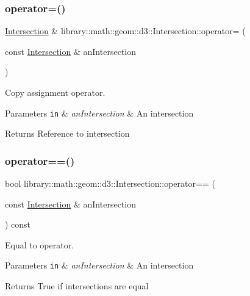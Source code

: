 \subsubsection{\texorpdfstring{operator=()}{operator=()}}
{\footnotesize\ttfamily \hyperlink{classlibrary_1_1math_1_1geom_1_1d3_1_1_intersection}{Intersection} \& library\+::math\+::geom\+::d3\+::\+Intersection\+::operator= (\begin{DoxyParamCaption}\item[{const \hyperlink{classlibrary_1_1math_1_1geom_1_1d3_1_1_intersection}{Intersection} \&}]{an\+Intersection }\end{DoxyParamCaption})}



Copy assignment operator. 


\begin{DoxyParams}[1]{Parameters}
\mbox{\tt in}  & {\em an\+Intersection} & An intersection \\
\hline
\end{DoxyParams}
\begin{DoxyReturn}{Returns}
Reference to intersection 
\end{DoxyReturn}
\mbox{\label{classlibrary_1_1math_1_1geom_1_1d3_1_1_intersection_a4205e2dcace3faa8abfeb829423d0baf}} 
\subsubsection{\texorpdfstring{operator==()}{operator==()}}
{\footnotesize\ttfamily bool library\+::math\+::geom\+::d3\+::\+Intersection\+::operator== (\begin{DoxyParamCaption}\item[{const \hyperlink{classlibrary_1_1math_1_1geom_1_1d3_1_1_intersection}{Intersection} \&}]{an\+Intersection }\end{DoxyParamCaption}) const}



Equal to operator. 


\begin{DoxyParams}[1]{Parameters}
\mbox{\tt in}  & {\em an\+Intersection} & An intersection \\
\hline
\end{DoxyParams}
\begin{DoxyReturn}{Returns}
True if intersections are equal 
\end{DoxyReturn}
\mbox{\label{classlibrary_1_1math_1_1geom_1_1d3_1_1_intersection_a5155cc245bd2bf96a4296b0a8319c709}} 
